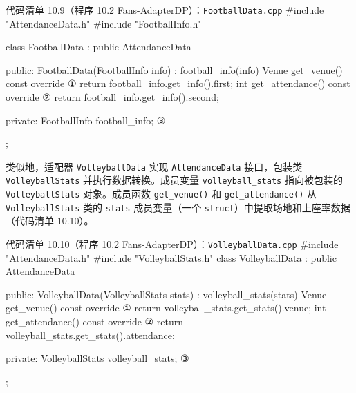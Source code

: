 
\begin{codeboxt}{代码清单 10.9（程序 10.2 Fans-AdapterDP）：\texttt{Football\allowbreak{}Data.\allowbreak{}cpp}}
#include "AttendanceData.h"
#include "FootballInfo.h"

class FootballData : public AttendanceData
{
public:
    FootballData(FootballInfo info) : football_info(info) {}
    Venue get_venue() const override       ①
    {
        return football_info.get_info().first;
    }
    int get_attendance() const override    ②
    {
        return football_info.get_info().second;
    }

private:
    FootballInfo football_info;            ③
};
\end{codeboxt}
\par
{}\par
{}\par

类似地，适配器 \texttt{Volleyball\allowbreak{}Data} 实现 \texttt{Attendance\allowbreak{}Data} 接口，包装类 \texttt{Volleyball\allowbreak{}Stats} 并执行数据转换。成员变量 \texttt{volleyball\_\allowbreak{}stats} 指向被包装的 \texttt{Volleyball\allowbreak{}Stats} 对象。成员函数 \texttt{get\_\allowbreak{}venue(\allowbreak{})\allowbreak{}} 和 \texttt{get\_\allowbreak{}attendance(\allowbreak{})\allowbreak{}} 从 \texttt{Volleyball\allowbreak{}Stats} 类的 \texttt{stats} 成员变量（一个 \texttt{struct}）中提取场地和上座率数据（代码清单 10.10）。

\begin{codeboxt}{代码清单 10.10（程序 10.2 Fans-AdapterDP）：\texttt{Volleyball\allowbreak{}Data.\allowbreak{}cpp}}
#include "AttendanceData.h"
#include "VolleyballStats.h"
class VolleyballData : public AttendanceData
{

public:
    VolleyballData(VolleyballStats stats)
        : volleyball_stats(stats) {}
    Venue get_venue() const override          ①
    {
        return volleyball_stats.get_stats().venue;
    }
    int get_attendance() const override       ②
    {
        return volleyball_stats.get_stats().attendance;
    }

private:
    VolleyballStats volleyball_stats;         ③
};
\end{codeboxt}
\par
{}\par
{}\par

